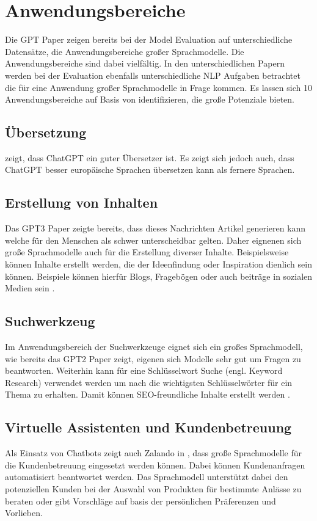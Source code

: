 \documentclass[conference]{IEEEtran}
\begin{document}
\section{Anwendungsbereiche}
Die GPT Paper zeigen bereits bei der Model Evaluation auf unterschiedliche Datensätze, die Anwendungsbereiche großer Sprachmodelle. Die Anwendungsbereiche sind dabei vielfältig. In den unterschiedlichen Papern werden bei der Evaluation ebenfalls unterschiedliche NLP Aufgaben betrachtet die für eine Anwendung großer Sprachmodelle in Frage kommen. Es lassen sich 10 Anwendungsbereiche auf Basis von \cite{keary12PraktischeLarge2023} identifizieren, die große Potenziale bieten.
\subsection{Übersetzung}
\cite{jiaoChatGPTGoodTranslator2023} zeigt, dass ChatGPT ein guter Übersetzer ist. Es zeigt sich jedoch auch, dass ChatGPT besser europäische Sprachen übersetzen kann als fernere Sprachen.
\subsection{Erstellung von Inhalten}
Das GPT3 Paper \cite{brownLanguageModelsAre2020} zeigte bereits, dass dieses Nachrichten Artikel generieren kann welche für den Menschen als schwer unterscheidbar gelten. Daher eignenen sich große Sprachmodelle auch für die Erstellung diverser Inhalte. Beispielsweise können Inhalte erstellt werden, die der Ideenfindung oder Inspiration dienlich sein können. Beispiele können hierfür Blogs, Fragebögen oder auch beiträge in sozialen Medien sein \cite{keary12PraktischeLarge2023}.
\subsection{Suchwerkzeug}
Im Anwendungsbereich der Suchwerkzeuge eignet sich ein großes Sprachmodell, wie bereits das GPT2 Paper \cite{radfordLanguageModelsAre} zeigt, eigenen sich Modelle sehr gut um Fragen zu beantworten. Weiterhin kann für eine Schlüsselwort Suche (engl. Keyword Research) verwendet werden um nach die wichtigsten Schlüsselwörter für ein Thema zu erhalten. Damit können SEO-freundliche Inhalte erstellt werden \cite{keary12PraktischeLarge2023}.
\subsection{Virtuelle Assistenten und Kundenbetreuung}
Als Einsatz von Chatbots zeigt auch Zalando in \cite{wuttkeLargeLanguageModel2023}, dass große Sprachmodelle für die Kundenbetreuung eingesetzt werden können. Dabei können Kundenanfragen automatisiert beantwortet werden. Das Sprachmodell unterstützt dabei den potenziellen Kunden bei der Auswahl von Produkten für bestimmte Anlässe zu beraten oder gibt Vorschläge auf basis der persönlichen Präferenzen und Vorlieben.
\end{document}
